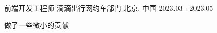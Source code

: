 

\begin{cventries}

    \cventry
    {前端开发工程师} %
    {滴滴出行\hspace{1mm}网约车部门} %
    {北京, 中国} %
    {2023.03 - 2023.05} %
    {
        \begin{cvitems} %
            \item {做了一些微小的贡献}
        \end{cvitems}
    }

\end{cventries}
